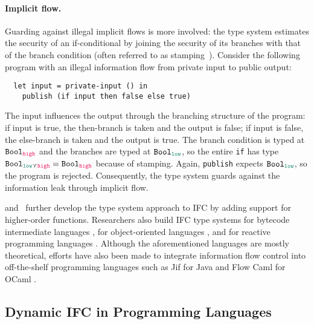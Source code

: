 \paragraph{Implicit flow.} Guarding against illegal implicit flows is
more involved: the type system estimates the security of an if-conditional by
joining the security of its branches with that of the branch condition (often
referred to as stamping~\parencite{zdancewic2002programming}). Consider the
following program with an illegal information flow from private input to public
output:
\begin{verbatim}
  let input = private-input () in
    publish (if input then false else true)
\end{verbatim}
The input influences the output through the branching structure of the program:
if input is true, the then-branch is taken and the output is false; if input is
false, the else-branch is taken and the output is true. The branch condition is
typed at $\Bool_{\high}$ and the branches are typed at $\Bool_{\low}$, so the
entire \texttt{if} has type $\Bool_{\low \curlyvee \high} = \Bool_{\high}$
because of stamping. Again, \texttt{publish} expects $\Bool_{\low}$, so the
program is rejected. Consequently, the type system guards against the
information leak through implicit flow.

\textcite{heintze1998slam} and~\textcite{zdancewic2002programming} further
develop the type system approach to IFC by adding support for higher-order
functions. Researchers also build IFC type systems for bytecode intermediate
languages \autocite{barthe2005non}, for object-oriented languages
\autocite{amtoft2006logic}, and for reactive programming languages
\autocite{bohannon2009reactive}. Although the aforementioned languages are
mostly theoretical, efforts have also been made to integrate information flow
control into off-the-shelf programming languages such as Jif for Java
\autocite{myers1999jflow} and Flow Caml for OCaml
\autocite{pottier2002information, simonet2003flow}.

\subsection{Dynamic IFC in Programming Languages}
\label{sec:intro-dyn-ifc}


